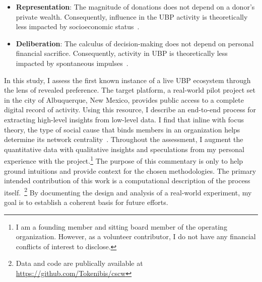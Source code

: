 \begin{itemize}
  \item \textbf{Representation}: The magnitude of donations does not depend on a donor's private wealth. Consequently, influence in the UBP activity is theoretically less impacted by socioeconomic status~\cite{james2007nature}.
  \item \textbf{Deliberation}: The calculus of decision-making does not depend on personal financial sacrifice. Consequently, activity in UBP is theoretically less impacted by spontaneous impulses~\cite{bennett2009impulsive}.
\end{itemize}

In this study, I assess the first known instance of a live UBP ecosystem through the lens of revealed preference.
The target platform, a real-world pilot project set in the city of Albuquerque, New Mexico, provides public access to a complete digital record of activity.
Using this resource, I describe an end-to-end process for extracting high-level insights from low-level data.
I find that inline with focus theory, the type of social cause that binds members in an organization helps determine its network centrality~\cite{feld1981focused}.
Throughout the assessment, I augment the quantitative data with qualitative insights and speculations from my personal experience with the project.\footnote{I am a founding member and sitting board member of the operating organization. However, as a volunteer contributor, I do not have any financial conflicts of interest to disclose.}
The purpose of this commentary is only to help ground intuitions and provide context for the chosen methodologies.
The primary intended contribution of this work is a computational description of the process itself.~\footnote{Data and code are publically available at \url{https://github.com/Tokenibis/cscw}}
By documenting the design and analysis of a real-world experiment, my goal is to establish a coherent basis for future efforts.
